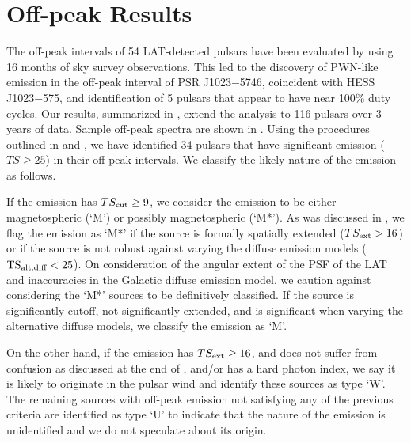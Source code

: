 \section{Off-peak Results}

The off-peak intervals of 54 LAT-detected pulsars have been evaluated
by \citet{ackermann_2011a_fermi-lat-search} using 16 months of sky
survey observations.  This led to the discovery of PWN-like emission
in the off-peak interval of PSR J1023$-$5746, coincident with HESS
J1023$-$575, and identification of 5 pulsars that appear to have near
100\% duty cycles.  Our results, summarized in ,
extend the analysis to 116 pulsars over 3 years of data.  Sample off-peak
spectra are shown in .  Using the procedures
outlined in  and , we
have identified 34 pulsars that have significant emission ($TS\geq25$)
in their off-peak intervals.  We classify the likely nature of the
emission as follows.

If the emission has $TS_{\rm cut}\geq9$, we consider the emission to be
either magnetospheric (`M') or possibly magnetospheric (`M*').  As was
discussed in , we flag the emission as `M*'
if the source is formally spatially extended ($TS_{\rm ext}>16$) or if
the source is not robust against varying the diffuse emission models
($\mathrm{TS}_{\text{alt,diff}}<25$).  On consideration of the angular extent of the PSF
of the LAT and inaccuracies in the Galactic diffuse emission model,
we caution against considering the `M*' sources to be definitively
classified.  If the source is significantly cutoff, not significantly
extended, and is significant when varying the alternative diffuse models,
we classify the emission as `M'.

On the other hand, if the emission has $TS_{\rm ext}\geq16$,
and does not suffer from confusion as discussed at the end of
, and/or has a hard photon index, we say it is
likely to originate in the pulsar wind and identify these sources as type
`W'.  The remaining sources with off-peak emission not satisfying any of
the previous criteria are identified as type `U' to indicate that the
nature of the emission is unidentified and we do not speculate about
its origin.

